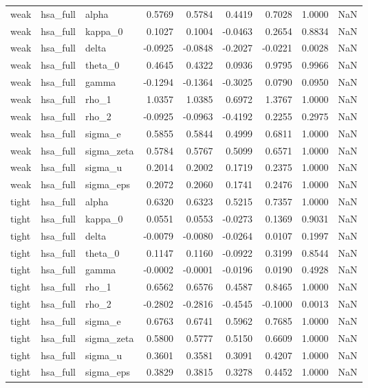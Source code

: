 \begin{tabular}{lllrrrrrl}
weak & hsa\_full & alpha & 0.5769 & 0.5784 & 0.4419 & 0.7028 & 1.0000 & NaN \\
weak & hsa\_full & kappa\_0 & 0.1027 & 0.1004 & -0.0463 & 0.2654 & 0.8834 & NaN \\
weak & hsa\_full & delta & -0.0925 & -0.0848 & -0.2027 & -0.0221 & 0.0028 & NaN \\
weak & hsa\_full & theta\_0 & 0.4645 & 0.4322 & 0.0936 & 0.9795 & 0.9966 & NaN \\
weak & hsa\_full & gamma & -0.1294 & -0.1364 & -0.3025 & 0.0790 & 0.0950 & NaN \\
weak & hsa\_full & rho\_1 & 1.0357 & 1.0385 & 0.6972 & 1.3767 & 1.0000 & NaN \\
weak & hsa\_full & rho\_2 & -0.0925 & -0.0963 & -0.4192 & 0.2255 & 0.2975 & NaN \\
weak & hsa\_full & sigma\_e & 0.5855 & 0.5844 & 0.4999 & 0.6811 & 1.0000 & NaN \\
weak & hsa\_full & sigma\_zeta & 0.5784 & 0.5767 & 0.5099 & 0.6571 & 1.0000 & NaN \\
weak & hsa\_full & sigma\_u & 0.2014 & 0.2002 & 0.1719 & 0.2375 & 1.0000 & NaN \\
weak & hsa\_full & sigma\_eps & 0.2072 & 0.2060 & 0.1741 & 0.2476 & 1.0000 & NaN \\
tight & hsa\_full & alpha & 0.6320 & 0.6323 & 0.5215 & 0.7357 & 1.0000 & NaN \\
tight & hsa\_full & kappa\_0 & 0.0551 & 0.0553 & -0.0273 & 0.1369 & 0.9031 & NaN \\
tight & hsa\_full & delta & -0.0079 & -0.0080 & -0.0264 & 0.0107 & 0.1997 & NaN \\
tight & hsa\_full & theta\_0 & 0.1147 & 0.1160 & -0.0922 & 0.3199 & 0.8544 & NaN \\
tight & hsa\_full & gamma & -0.0002 & -0.0001 & -0.0196 & 0.0190 & 0.4928 & NaN \\
tight & hsa\_full & rho\_1 & 0.6562 & 0.6576 & 0.4587 & 0.8465 & 1.0000 & NaN \\
tight & hsa\_full & rho\_2 & -0.2802 & -0.2816 & -0.4545 & -0.1000 & 0.0013 & NaN \\
tight & hsa\_full & sigma\_e & 0.6763 & 0.6741 & 0.5962 & 0.7685 & 1.0000 & NaN \\
tight & hsa\_full & sigma\_zeta & 0.5800 & 0.5777 & 0.5150 & 0.6609 & 1.0000 & NaN \\
tight & hsa\_full & sigma\_u & 0.3601 & 0.3581 & 0.3091 & 0.4207 & 1.0000 & NaN \\
tight & hsa\_full & sigma\_eps & 0.3829 & 0.3815 & 0.3278 & 0.4452 & 1.0000 & NaN \\
\bottomrule
\end{tabular}
